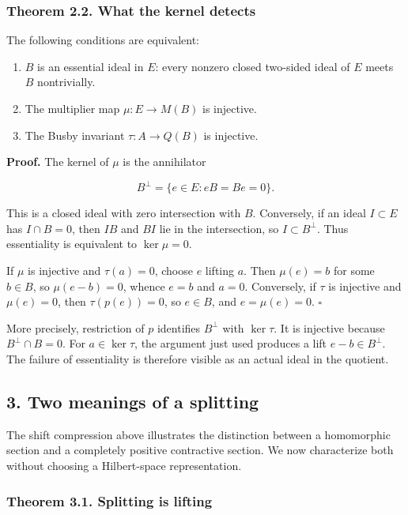 \documentclass[
  11pt,
]{article}
\providecommand{\tightlist}{%
  \setlength{\itemsep}{0pt}\setlength{\parskip}{0pt}}
\begin{document}
\subsubsection{Theorem 2.2. What the kernel
detects}\label{theorem-2.2.-what-the-kernel-detects}

The following conditions are equivalent:

\begin{enumerate}
\def\labelenumi{\arabic{enumi}.}
\tightlist
\item
  \(B\) is an essential ideal in \(E\): every nonzero closed two-sided
  ideal of \(E\) meets \(B\) nontrivially.
\item
  The multiplier map \(\mu:E\to M(B)\) is injective.
\item
  The Busby invariant \(\tau:A\to Q(B)\) is injective.
\end{enumerate}

\textbf{Proof.} The kernel of \(\mu\) is the annihilator

\[
B^\perp=\{e\in E:eB=Be=0\}.
\]

This is a closed ideal with zero intersection with \(B\). Conversely, if
an ideal \(I\subset E\) has \(I\cap B=0\), then \(IB\) and \(BI\) lie in
the intersection, so \(I\subset B^\perp\). Thus essentiality is
equivalent to \(\ker\mu=0\).

If \(\mu\) is injective and \(\tau(a)=0\), choose \(e\) lifting \(a\).
Then \(\mu(e)=b\) for some \(b\in B\), so \(\mu(e-b)=0\), whence \(e=b\)
and \(a=0\). Conversely, if \(\tau\) is injective and \(\mu(e)=0\), then
\(\tau(p(e))=0\), so \(e\in B\), and \(e=\mu(e)=0\). \(\square\)

More precisely, restriction of \(p\) identifies \(B^\perp\) with
\(\ker\tau\). It is injective because \(B^\perp\cap B=0\). For
\(a\in\ker\tau\), the argument just used produces a lift
\(e-b\in B^\perp\). The failure of essentiality is therefore visible as
an actual ideal in the quotient.

\subsection{3. Two meanings of a
splitting}\label{two-meanings-of-a-splitting}

The shift compression above illustrates the distinction between a
homomorphic section and a completely positive contractive section. We
now characterize both without choosing a Hilbert-space representation.

\subsubsection{Theorem 3.1. Splitting is
lifting}\label{theorem-3.1.-splitting-is-lifting}
\end{document}
